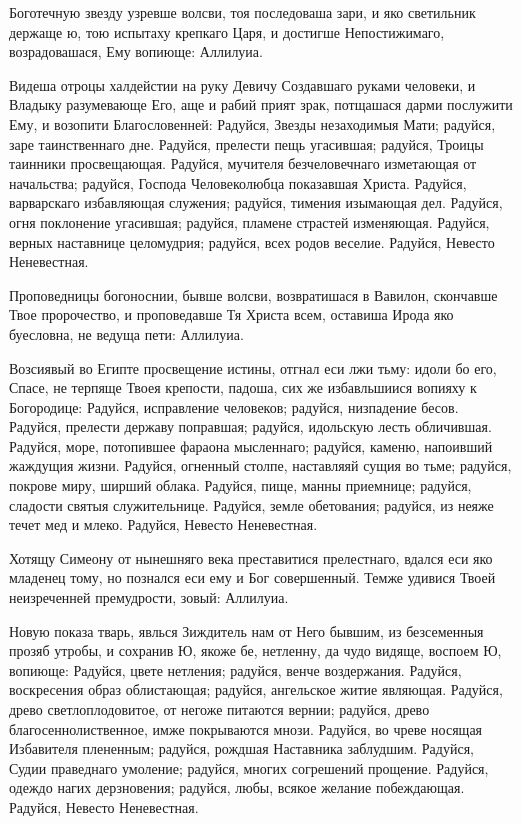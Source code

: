 

Боготечную звезду узревше волсви, тоя последоваша зари, и яко светильник держаще ю, тою испытаху крепкаго Царя, и достигше Непостижимаго, возрадовашася, Ему вопиюще: Аллилуиа.




Видеша отроцы халдейстии на руку Девичу Создавшаго руками человеки, и Владыку разумевающе Его, аще и рабий прият зрак, потщашася дарми послужити Ему, и возопити Благословенней: Радуйся, Звезды незаходимыя Мати; радуйся, заре таинственнаго дне. Радуйся, прелести пещь угасившая; радуйся, Троицы таинники просвещающая. Радуйся, мучителя безчеловечнаго изметающая от начальства; радуйся, Господа Человеколюбца показавшая Христа. Радуйся, варварскаго избавляющая служения; радуйся, тимения изымающая дел. Радуйся, огня поклонение угасившая; радуйся, пламене страстей изменяющая. Радуйся, верных наставнице целомудрия; радуйся, всех родов веселие. Радуйся, Невесто Неневестная.




Проповедницы богоноснии, бывше волсви, возвратишася в Вавилон, скончавше Твое пророчество, и проповедавше Тя Христа всем, оставиша Ирода яко буесловна, не ведуща пети: Аллилуиа.




Возсиявый во Египте просвещение истины, отгнал еси лжи тьму: идоли бо его, Спасе, не терпяще Твоея крепости, падоша, сих же избавльшиися вопияху к Богородице: Радуйся, исправление человеков; радуйся, низпадение бесов. Радуйся, прелести державу поправшая; радуйся, идольскую лесть обличившая. Радуйся, море, потопившее фараона мысленнаго; радуйся, каменю, напоивший жаждущия жизни. Радуйся, огненный столпе, наставляяй сущия во тьме; радуйся, покрове миру, ширший облака. Радуйся, пище, манны приемнице; радуйся, сладости святыя служительнице. Радуйся, земле обетования; радуйся, из неяже течет мед и млеко. Радуйся, Невесто Неневестная.




Хотящу Симеону от нынешняго века преставитися прелестнаго, вдался еси яко младенец тому, но познался еси ему и Бог совершенный. Темже удивися Твоей неизреченней премудрости, зовый: Аллилуиа.




Новую показа тварь, явлься Зиждитель нам от Него бывшим, из безсеменныя прозяб утробы, и сохранив Ю, якоже бе, нетленну, да чудо видяще, воспоем Ю, вопиюще: Радуйся, цвете нетления; радуйся, венче воздержания. Радуйся, воскресения образ облистающая; радуйся, ангельское житие являющая. Радуйся, древо светлоплодовитое, от негоже питаются вернии; радуйся, древо благосеннолиственное, имже покрываются мнози. Радуйся, во чреве носящая Избавителя плененным; радуйся, рождшая Наставника заблудшим. Радуйся, Судии праведнаго умоление; радуйся, многих согрешений прощение. Радуйся, одеждо нагих дерзновения; радуйся, любы, всякое желание побеждающая. Радуйся, Невесто Неневестная.


